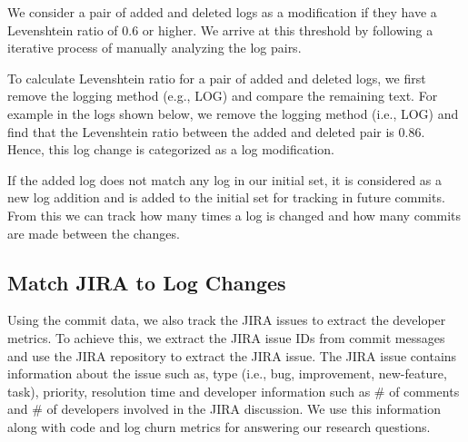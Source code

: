  We consider a pair of added and deleted logs as a modification if they have a Levenshtein ratio of 0.6 or higher. We arrive at this threshold by following a iterative process of manually analyzing the log pairs. 
 
 To calculate Levenshtein ratio for a pair of added and deleted logs, we first remove the logging method (e.g., LOG) and compare the remaining text. For example in the logs shown below, we remove the logging method (i.e., LOG) and find that the Levenshtein ratio between the added and deleted pair is 0.86. Hence, this log change is categorized as a log modification.  


If the added log does not match any log in our initial set, it is considered as a new log addition and is added to the initial set for tracking in future commits. From this we can track how many times a log is changed and how many commits are made between the changes. 


\subsection{Match JIRA to Log Changes}

Using the commit data, we also track the JIRA issues to extract the developer metrics. To achieve this, we extract the JIRA issue IDs from commit messages and use the JIRA repository to extract the JIRA issue. The JIRA issue contains information about the issue such as, type (i.e., bug, improvement, new-feature, task), priority, resolution time and developer information such as \# of comments and \# of developers involved in the JIRA discussion. We use this information along with code and log churn metrics for answering our research questions. 




 







